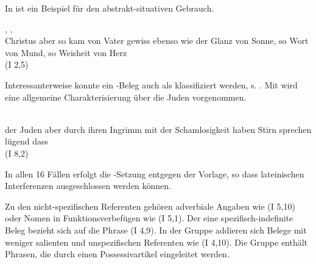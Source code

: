 In  ist ein Beispiel für den abstrakt-situativen Gebrauch. 
%
\begin{exe}
\ex \label{ex:I683} \gll {}           ,    ,     \\
{Christus} {aber} {so} {kam} {von} {Vater} {gewiss} {ebenso wie} {der} {Glanz} {von} {Sonne}, {so} {Wort} {von} {Mund}, {so} {Weisheit} {von} {Herz} {}\\
\glt {} (I 2,5)
\end{exe}

Interessanterweise konnte ein -Beleg auch als  klassifiziert werden, s. . Mit  wird eine allgemeine Charakterisierung über die Juden vorgenommen. 
%

\begin{exe}
\ex \label{ex:I4768} \gll {}             \\
{der} {Juden} {aber} {durch} {ihren} {Ingrimm} {mit} {der} {Schamlosigkeit} {haben} {Stirn} {sprechen} {lügend} {dass}\\
\glt {}(I 8,2)
\end{exe}

In allen 16 Fällen erfolgt die -Setzung entgegen der Vorlage, so dass lateinischen Interferenzen ausgeschlossen werden können.

Zu den nicht-spezifischen Referenten gehören adverbiale Angaben wie  (I 5,10) oder Nomen in Funktionsverbefügen wie   (I 5,1). Der eine spezifisch-indefinite Beleg bezieht sich auf die Phrase   (I 4,9). In der Gruppe  addieren sich Belege mit weniger salienten und unspezifischen Referenten wie   (I 4,10). Die Gruppe  enthält Phrasen, die durch einen Possessivartikel eingeleitet werden. 

